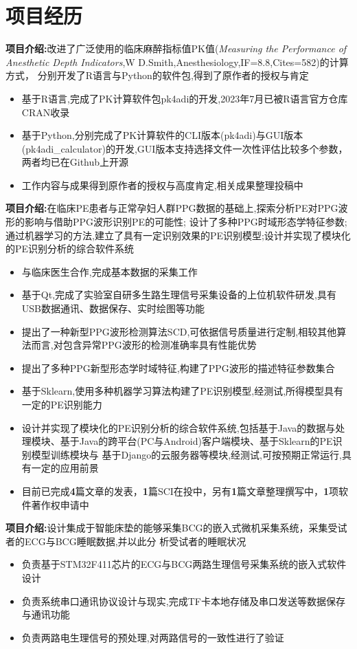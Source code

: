 \documentclass{resume}
\begin{document}
\section{项目经历}
\textbf{项目介绍:}改进了广泛使用的临床麻醉指标值PK值(\textit{Measuring the Performance of Anesthetic Depth Indicators},W D.Smith,Anesthesiology,IF=8.8,Cites=582)的计算方式，
分别开发了R语言与Python的软件包,得到了原作者的授权与肯定
\begin{itemize}
    \item 基于R语言,完成了PK计算软件包pk4adi的开发,2023年7月已被R语言官方仓库CRAN收录
    \item 基于Python,分别完成了PK计算软件的CLI版本(pk4adi)与GUI版本(pk4adi\_calculator)的开发,GUI版本支持选择文件一次性评估比较多个参数，两者均已在Github上开源
    \item 工作内容与成果得到原作者的授权与高度肯定,相关成果整理投稿中
\end{itemize}
\textbf{项目介绍:}在临床PE患者与正常孕妇人群PPG数据的基础上,探索分析PE对PPG波形的影响与借助PPG波形识别PE的可能性;
设计了多种PPG时域形态学特征参数;通过机器学习的方法,建立了具有一定识别效果的PE识别模型;设计并实现了模块化的PE识别分析的综合软件系统
\begin{itemize}
  \item 与临床医生合作,完成基本数据的采集工作
  \item 基于Qt,完成了实验室自研多生路生理信号采集设备的上位机软件研发,具有USB数据通讯、数据保存、实时绘图等功能
  \item 提出了一种新型PPG波形检测算法SCD,可依据信号质量进行定制,相较其他算法而言,对包含异常PPG波形的检测准确率具有性能优势
  \item 提出了多种PPG新型形态学时域特征,构建了PPG波形的描述特征参数集合
  \item 基于Sklearn,使用多种机器学习算法构建了PE识别模型,经测试,所得模型具有一定的PE识别能力
  \item 设计并实现了模块化的PE识别分析的综合软件系统,包括基于Java的数据与处理模块、基于Java的跨平台(PC与Android)客户端模块、基于Sklearn的PE识别模型训练模块与
  基于Django的云服务器等模块,经测试,可按预期正常运行,具有一定的应用前景
  \item 目前已完成\textbf{4}篇文章的发表，\textbf{1}篇SCI在投中，另有\textbf{1}篇文章整理撰写中，\textbf{1}项软件著作权申请中
\end{itemize}
\textbf{项目介绍:}设计集成于智能床垫的能够采集BCG的嵌入式微机采集系统，采集受试者的ECG与BCG睡眠数据,并以此分
析受试者的睡眠状况
\begin{itemize}
  \item 负责基于STM32F411芯片的ECG与BCG两路生理信号采集系统的嵌入式软件设计
  \item 负责系统串口通讯协议设计与现实,完成TF卡本地存储及串口发送等数据保存与通讯功能
  \item 负责两路电生理信号的预处理,对两路信号的一致性进行了验证
\end{itemize}
\end{document}

